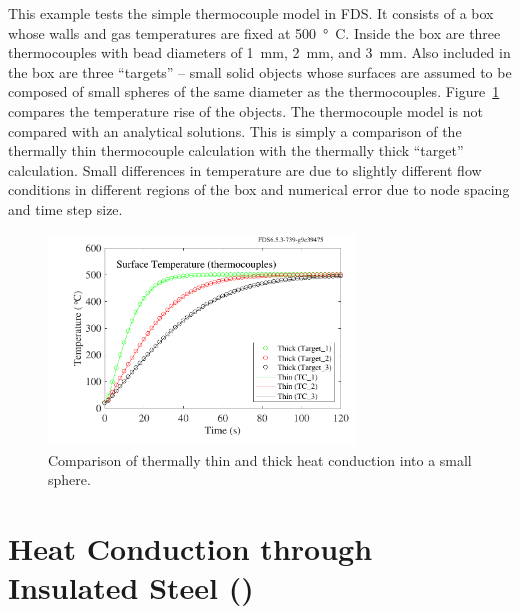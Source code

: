 \documentclass[11pt]{book}
\begin{document}
This example tests the simple thermocouple model in FDS. It consists of a box whose walls and gas temperatures are fixed at 500~\si{\degree C}. Inside the box are three thermocouples with bead diameters of 1~mm, 2~mm, and 3~mm. Also included in the box are three ``targets'' -- small solid objects whose surfaces are assumed to be composed of small spheres of the same diameter as the thermocouples. Figure~\ref{thermocouples_fig} compares the temperature rise of the objects. The thermocouple model is not compared with an analytical solutions. This is simply a comparison of the thermally thin thermocouple calculation with the thermally thick ``target'' calculation. Small differences in temperature are due to slightly different flow conditions in different regions of the box and numerical error due to node spacing and time step size.

\begin{figure}[ht]
\centering
\includegraphics[width=3.2in]{SCRIPT_FIGURES/thermocouples}
\caption[The  test case]{Comparison of thermally thin and thick heat conduction into a small sphere.}
\label{thermocouples_fig}
\end{figure}


\clearpage

\section{Heat Conduction through Insulated Steel (\texorpdfstring{}{insulated\_steel\_x})}
\label{insulated_steel_pipe}
\label{insulated_steel_plate}
\end{document}
